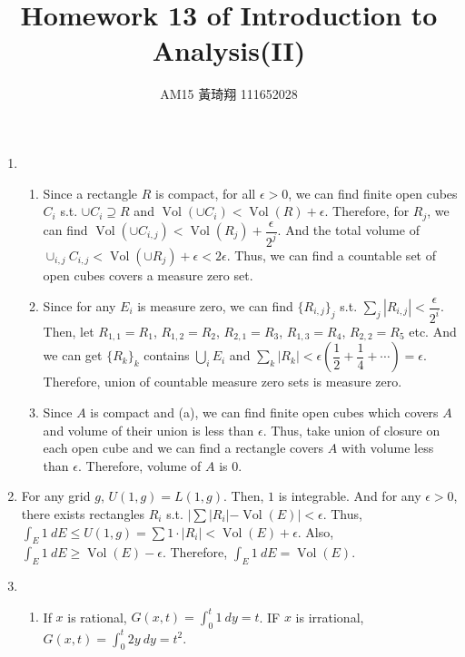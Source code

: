 \documentclass[12pt]{article}
\title{Homework 13 of Introduction to Analysis(II)}
\author{AM15 黃琦翔 111652028}
\DeclareMathOperator{\volume}{Vol}
\begin{document}
\maketitle
\begin{enumerate}
    \item \begin{enumerate}
        \item Since a rectangle $R$ is compact, for all $\epsilon > 0$, we can find finite open cubes $C_i$ s.t. $\cup C_i \supseteq R$
        and $\volume(\cup C_i) < \volume(R) + \epsilon$.
        Therefore, for $R_j$, we can find $\volume(\cup C_{i, j}) < \volume(R_j) + \dfrac{\epsilon}{2^j}$.
        And the total volume of $\displaystyle\cup_{i, j} C_{i, j} < \volume(\cup R_j) + \epsilon < 2\epsilon$.
        Thus, we can find a countable set of open cubes covers a measure zero set.

        \item Since for any $E_i$ is measure zero, we can find $\{ R_{i, j}\}_j$ s.t. 
        $\displaystyle\sum_{j} |R_{i, j}| < \dfrac{\epsilon}{2^{i}}$.
        Then, let $R_{1, 1} = R_1$, $R_{1,2} = R_2$, $R_{2, 1} = R_3$, $R_{1, 3} = R_4$, $R_{2, 2} = R_5$ etc.
        And we can get $\{ R_k\}_k$ contains $\displaystyle\bigcup_i E_i$ and $\displaystyle\sum_{k} |R_k| < \epsilon(\dfrac{1}{2} + \dfrac{1}{4} + \cdots) = \epsilon$.
        Therefore, union of countable measure zero sets is measure zero.

        \item Since $A$ is compact and (a), we can find finite open cubes which covers $A$ and volume of their union is less than $\epsilon$.
        Thus, take union of closure on each open cube and we can find a rectangle covers $A$ with volume less than $\epsilon$.
        Therefore, volume of $A$ is $0$.
    \end{enumerate}

    \item For any grid $g$, $U(1, g) = L(1, g)$. Then, $1$ is integrable.
    And for any $\epsilon > 0$, there exists rectangles $R_i$ s.t. $|\sum |R_i| - \volume(E)| <\epsilon$.
    Thus, $\displaystyle\int_E 1\ dE \leq U(1, g) = \sum 1 \cdot |R_i| < \volume(E) + \epsilon$.
    Also, $\displaystyle\int_E 1\ dE \geq \volume(E) - \epsilon$.
    Therefore, $\displaystyle\int_E 1\ dE = \volume(E)$.

    \item \begin{enumerate}
        \item If $x$ is rational, $G(x, t) = \displaystyle\int_{0}^{t} 1\ dy = t$.
        IF $x$ is irrational, $G(x, t) = \displaystyle\int_{0}^{t} 2y\ dy = t^2$.


\end{enumerate}
\end{enumerate}
\end{document}
